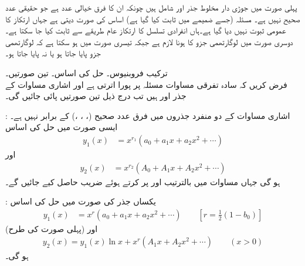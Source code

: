 پہلی صورت میں جوڑی دار مخلوط جذر  اور  شامل ہیں چونکہ ان کا فرق  خیالی عدد ہے جو حقیقی عدد صحیح نہیں ہے۔ مسئلہ  (جسے ضمیمے میں ثابت کیا گیا ہے) اساس کی صورت دیتی ہے جہاں ارتکاز کا عمومی ثبوت نہیں دیا گیا ہے۔ہاں انفرادی تسلسل کا ارتکاز عام طریقے سے ثابت کیا جا سکتا ہے۔  دوسری صورت میں لوگارتھمی جزو کا ہونا لازم ہے جبکہ تیسری صورت میں ہو سکتا ہے کہ لوگارتھمی جزو پایا جاتا ہو یا نہ پایا جاتا ہو۔

\quad ترکیب فروبنیوس۔ حل کی اساس۔ تین صورتیں۔\\
فرض کریں کہ سادہ تفرقی مساوات  مسئلہ  پر پورا اترتی ہے  اور اشاری مساوات  کے جذر  اور  ہیں تب درج ذیل تین صورتیں پائی جائیں گی۔


: اشاری مساوات کے دو  منفرد جذروں میں فرق عدد صحیح (، ، ،) کے برابر نہیں ہے۔ایسی صورت میں حل کی اساس
\begin{align}\label{مساوات_طاقتی_فروبنیوس_حل_الف}
y_1(x)&=x^{r_1}(a_0+a_1x+a_2x^2+\cdots)
\end{align}
اور
\begin{align}\label{مساوات_طاقتی_فروبنیوس_حل_ب}
y_2(x)&=x^{r_2}(A_0+A_1x+A_2x^2+\cdots)
\end{align}
ہو گی جہاں  مساوات  میں بالترتیب  اور  پر کرتے ہوئے  ضریب  حاصل کیے جائیں گے۔

: یکساں جذر  کی صورت میں حل کی اساس
\begin{align}\label{مساوات_طاقتی_فروبنیوس_حل_پ}
y_1(x)&=x^{r}(a_0+a_1x+a_2x^2+\cdots) \quad \quad [r=\frac{1}{2}(1-b_0)]
\end{align}
(پہلی صورت کی طرح) اور
\begin{align}\label{مساوات_طاقتی_فروبنیوس_حل_ت}
y_2(x)=y_1(x)\ln x+x^{r}(A_1x+A_2x^2+\cdots) \quad \quad (x>0)
\end{align}
ہو گی۔

